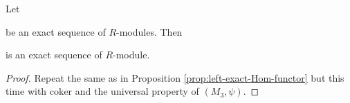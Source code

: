\begin{proposition}
    Let 
    be an exact sequence of $R$-modules. Then
    \begin{center}
    \end{center}
    is an exact sequence of $R$-module. 
    \label{prop:right-exact-Hom-functor}
\end{proposition}
\begin{proof}
Repeat the same as in Proposition \ref{prop:left-exact-Hom-functor} but this time with $\text{coker}$ and the universal property of $\left( M_3 , \psi \right)$.
\end{proof}
